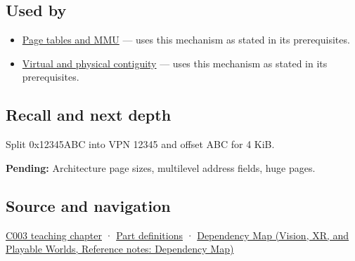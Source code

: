 \subsection{Used by}\label{appendix-0c67cd5bf30a-used-by}

\hypertarget{appendix-0c67cd5bf30a-used-by}{}

\begin{itemize}
\tightlist
\item
  \hyperref[appendix-01e5905165c4]{Page tables and MMU} --- uses this mechanism as stated in its prerequisites.
\item
  \hyperref[appendix-f897c1ddac8f]{Virtual and physical contiguity} --- uses this mechanism as stated in its prerequisites.
\end{itemize}

\subsection{Recall and next depth}\label{appendix-0c67cd5bf30a-recall-and-next-depth}

\hypertarget{appendix-0c67cd5bf30a-recall-and-next-depth}{}

Split 0x12345ABC into VPN 12345 and offset ABC for 4 KiB.

\textbf{Pending:} Architecture page sizes, multilevel address fields, huge pages.

\subsection{Source and navigation}\label{appendix-0c67cd5bf30a-source-and-navigation}

\hypertarget{appendix-0c67cd5bf30a-source-and-navigation}{}

\hyperref[01-foundations-i-ch002-where-the-bytes-live]{C003 teaching chapter} · \hyperref[appendix-fd090d982a15-m003---parts-41-60]{Part definitions} · \href{../07-Vision-XR-and-Playable-Worlds/main.pdf\#nameddest=appendix-4ad47bdd269a}{Dependency Map (Vision, XR, and Playable Worlds, Reference notes: Dependency Map)}
